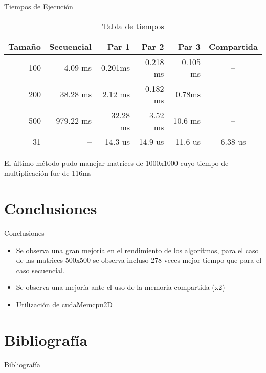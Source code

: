 \documentclass{beamer}
\let\oldfootnotesize\footnotesize
\renewcommand*{\footnotesize}{\oldfootnotesize\tiny}
\begin{document}
\begin{frame}{Tiempos de Ejecución}
\begin{table}[H]
\centering
\scriptsize
	\begin{tabular}{rrrrrc}
		\hline\hline
		\textbf{Tamaño} & \textbf{Secuencial} & \textbf{Par 1} & \textbf{Par 2} & \textbf{Par 3}&\textbf{Compartida}\\
		\hline
		100 & 4.09 ms&0.201ms & 0.218 ms&0.105 ms&--\\
		200 &38.28 ms&2.12 ms &	0.182 ms	 & 0.78ms&--\\
		500	&979.22 ms&32.28 ms	&3.52 ms	&10.6 ms&--\\
		31 &--&14.3 us&14.9 us&11.6 us\footnotemark &6.38 us\\


		\hline
	\end{tabular}
	\caption{Tabla de tiempos}
	\label{tab:tiempos}
\end{table}
	\begin{block}{}
	\scriptsize
		El último método pudo manejar matrices de 1000x1000 cuyo tiempo de multiplicación fue de 116ms
	\end{block}
\end{frame}
\section{Conclusiones}
\begin{frame}{Conclusiones}
	
\begin{block}{}
	\begin{itemize}
		\item Se observa una gran mejoría en el rendimiento de los algoritmos, para el caso de las matrices 500x500 se observa incluso 278 veces mejor tiempo que para el caso secuencial. 
		\item Se observa una mejoría ante el uso de la memoria compartida (x2)
		\item Utilización de cudaMemcpu2D
	\end{itemize}
\end{block}
\end{frame}

\section{Bibliografía}
\begin{frame}{Bibliografía}\:
{
	\footnotesize
	
	
	\nocite{*}
 }
\end{frame}

\begin{frame}
	\titlepage
\end{frame}
\end{document}
